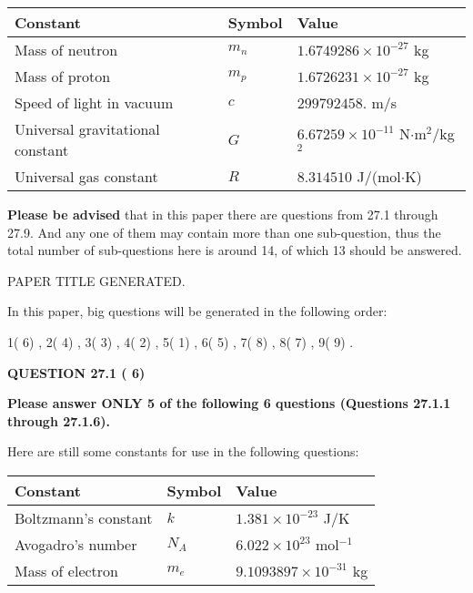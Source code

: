 \documentclass[12pt]{article}
\begin{document}
 
\noindent\begin{tabular}{|l|l|l|}
\hline
Constant & Symbol & Value \\
\hline
Mass of neutron &
$m_n$ &
 $ 1.6749286 \times 10^{-27} $
kg \\
\hline
Mass of proton &
$m_p$ &
 $ 1.6726231 \times 10^{-27} $
kg \\
\hline
Speed of light in vacuum &
$c$ &
 $ 299792458. $
m/s \\
\hline
Universal gravitational constant &
$G$ &
 $ 6.67259 \times 10^{-11} $
N$\cdot $m$^2$/kg$^2$ \\
\hline
Universal gas constant &
$R$ &
 $ 8.314510 $
J/(mol$\cdot $K) \\
\hline
\end{tabular}
 
 
{\textbf{\large{Please be advised}}} that in this paper there are questions from
27.1 through
27.9.
And any one of them may contain more than one sub-question, thus the total number
of sub-questions here is around 14, of which
13 should be answered.
 
\vspace{0.3in}
 
 
   
   
 PAPER TITLE GENERATED.
   
   
   
\vspace{0.2in}
   
In this paper, big questions will be generated in the following order: 
   
   
            1(          6)
 ,
            2(          4)
 ,
            3(          3)
 ,
            4(          2)
 ,
            5(          1)
 ,
            6(          5)
 ,
            7(          8)
 ,
            8(          7)
 ,
            9(          9)
 .
  
\vspace{0.2in}
  
{\textbf{\Large{QUESTION
27.1 
 (          6)
}}}
  
  
 
{\textbf{\Large{Please answer ONLY
5 of the following
6 questions (Questions
27.1.1 through
27.1.6). }}}
 
Here are still some constants for use in the following questions:
 
 
\noindent\begin{tabular}{|l|l|l|}
\hline
Constant & Symbol & Value \\
\hline
 
Boltzmann's constant &
$k$ &
 $ 1.381 \times 10^{-23} $
J/K \\
\hline
 
Avogadro's number &
$N_A$ &
 $ 6.022 \times 10^{23} $
mol$^{-1}$ \\
\hline
 
Mass of electron &
$m_e$ &
 $ 9.1093897 \times 10^{-31} $
kg \\
\hline
 
\end{tabular}
 
\end{document}
